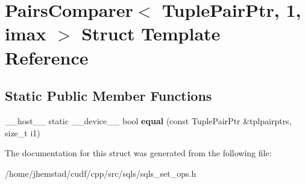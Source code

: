 \hypertarget{structPairsComparer_3_01TuplePairPtr_00_011_00_01imax_01_4}{}\section{Pairs\+Comparer$<$ Tuple\+Pair\+Ptr, 1, imax $>$ Struct Template Reference}
\label{structPairsComparer_3_01TuplePairPtr_00_011_00_01imax_01_4}
\subsection*{Static Public Member Functions}
\begin{DoxyCompactItemize}
\item 
\+\_\+\+\_\+host\+\_\+\+\_\+ static \+\_\+\+\_\+device\+\_\+\+\_\+ bool {\bfseries equal} (const Tuple\+Pair\+Ptr \&tplpairptrs, size\+\_\+t i1)\hypertarget{structPairsComparer_3_01TuplePairPtr_00_011_00_01imax_01_4_a867d745bf1c5e50e4fc3336d8d5306c2}{}\label{structPairsComparer_3_01TuplePairPtr_00_011_00_01imax_01_4_a867d745bf1c5e50e4fc3336d8d5306c2}

\end{DoxyCompactItemize}


The documentation for this struct was generated from the following file\+:\begin{DoxyCompactItemize}
\item 
/home/jhemstad/cudf/cpp/src/sqls/sqls\+\_\+set\+\_\+ops.\+h\end{DoxyCompactItemize}
